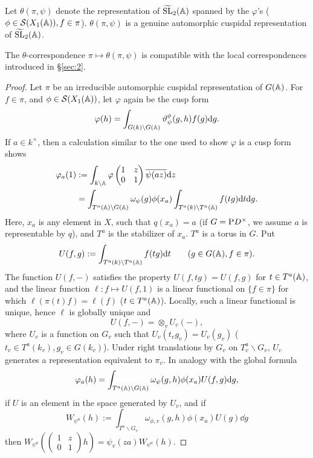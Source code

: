 Let $\theta(\pi, \psi)$ denote the representation of $\widetilde{\mathrm{SL}}_2(\mathbb{A})$ spanned by the $\varphi$'s ($\phi \in \mathcal{S}(X_1(\mathbb{A})), f \in \pi$).
$\theta(\pi, \psi)$ is a genuine automorphic cuspidal representation of $\widetilde{\mathrm{SL}}_2(\mathbb{A})$.

\begin{theorem}
\label{thm:3.1}
The $\theta$-correspondence $\pi \mapsto \theta(\pi, \psi)$ is compatible with the local correspondences introduced in \S \ref{sec:2}.
\end{theorem}

\begin{proof}
Let $\pi$ be an irreducible automorphic cuspidal representation of $G(\mathbb{A})$. For $f \in \pi$, and $\phi \in \mathcal{S}(X_1(\mathbb{A}))$, let $\varphi$ again be the cusp form
\[
\varphi(h) = \int_{G(k) \backslash G(\mathbb{A})} \vartheta_{\psi}^\phi(g, h) f(g) \mathrm{d} g.
\]
If $a \in k^\times$, then a calculation similar to the one used to show $\varphi$ is a cusp form shows
\begin{align}
    \varphi_a(1) &:= \int_{k \backslash \mathbb{A}} \varphi \begin{pmatrix}
        1 & z \\ 0& 1
    \end{pmatrix} \overline{\psi(az)} \mathrm{d} z \nonumber \\ 
    &= \int_{T^a(\mathbb{A}) \backslash G(\mathbb{A})} \omega_\psi(g) \phi(x_a) \int_{T^a(k) \backslash T^a(\mathbb{A})} f(tg) \mathrm{d} t \mathrm{d} g. \label{eqn:F}
\end{align}
Here, $x_a$ is any element in $X$, such that $q(x_a) = a$ (if $G = \mathrm{P} D^\times$, we assume $a$ is representable by $q$), and $T^a$ is the stabilizer of $x_a$.
$T^a$ is a torus in $G$.
Put
\[
U(f, g) := \int_{T^a(k) \backslash T^a(\mathbb{A})} f(tg) \mathrm{d} t\qquad (g \in G(\mathbb{A}), f \in \pi).
\]
The function $U(f, -)$ satisfies the property $U(f, tg) = U(f, g)$ for $t \in T^a(\mathbb{A})$, and the linear function $\ell: f \mapsto U(f, 1)$ is a linear functional on $\{f\in \pi\}$ for which $\ell(\pi(t)f) = \ell(f)$ ($t \in T^a(\mathbb{A})$).
Locally, such a linear functional is unique, hence $\ell$ is globally unique and
\[
U(f, -) = \otimes_v U_v(-),
\]
where $U_v$ is a function on $G_v$ such that $U_v(t_v g_v) = U_v(g_v)$ ($t_v \in T^a(k_v), g_v \in G(k_v)$).
Under right translations by $G_v$ on $T^a_v \backslash G_v$, $U_v$ generates a representation equivalent to $\pi_v$. In analogy with the global formula
\[
\varphi_a(h) = \int_{T^a(\mathbb{A}) \backslash G(\mathbb{A})} \omega_\psi(g, h) \phi(x_a) U(f, g) \mathrm{d} g,
\]
if $U$ is an element in the space generated by $U_v$, and if
\[
W_{\psi^a}(h) := \int_{T^a \backslash G_v} \omega_{\phi, v}(g, h) \phi(x_a) U(g) \dd g
\]
then $W_{\psi^a}\left(\left(\begin{smallmatrix}
    1 & z \\ 0 & 1
\end{smallmatrix}\right)h\right) = \psi_v(za) W_{\psi^a}(h)$.
\end{proof}

